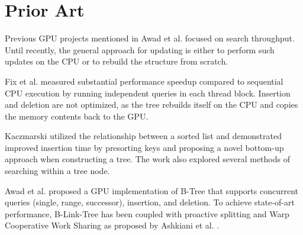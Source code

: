 \section{Prior Art}

Previous GPU projects mentioned in Awad et al. \cite{awad} focused on search throughput. Until recently, the general approach for updating is either to perform such updates on the CPU or to rebuild the structure from scratch.

Fix et al. \cite{fix2011accelerating} measured substantial performance speedup compared to sequential CPU execution by running independent queries in each thread block. Insertion and deletion are not optimized, as the tree rebuilds itself on the CPU and copies the memory contents back to the GPU.

Kaczmarski \cite{kaczmarski} utilized the relationship between a sorted list and demonstrated improved insertion time by presorting keys and proposing a novel bottom-up approach when constructing a tree. The work also explored several methods of searching within a tree node.

Awad et al. \cite{awad} proposed a GPU implementation of B-Tree that supports concurrent queries (single, range, successor), insertion, and deletion. To achieve state-of-art performance, B-Link-Tree has been coupled with proactive splitting and Warp Cooperative Work Sharing as proposed by Ashkiani et al. \cite{ashkiani2018dynamic}.